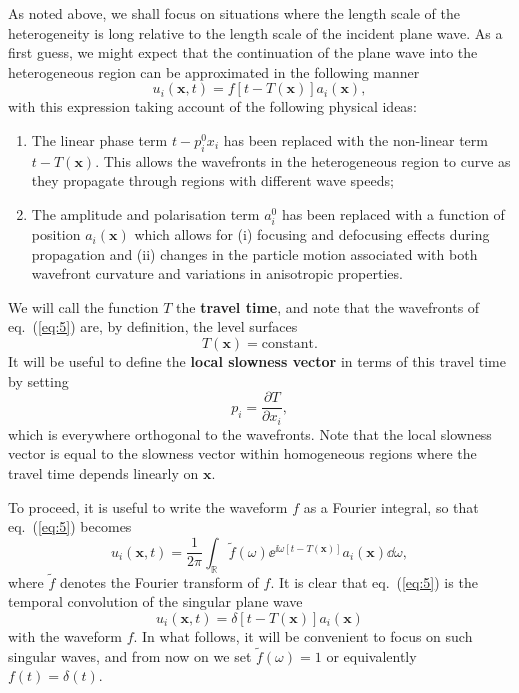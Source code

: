 As noted above, we shall focus on situations where the length scale of the heterogeneity is long 
relative to the length scale of the incident plane wave. As a first guess, we might expect that the continuation of 
the plane wave into the heterogeneous region can be approximated in the following manner
\begin{equation}
u_{i}(\mathbf{x},t)=f[t-T(\mathbf{x})]a_{i}(\mathbf{x}),
\label{eq:5}
\end{equation}
with this expression taking account of the following physical ideas:
\begin{enumerate}
    \item The linear phase term $t-p_{i}^{0}x_{i}$ has been replaced with the non-linear term $t-T(\mathbf{x})$. This allows the 
    wavefronts in the heterogeneous region to curve as they propagate through regions with different wave speeds;
    \item The amplitude and polarisation term $a_{i}^{0}$ has been replaced with a function of position $a_{i}(\mathbf{x})$ which 
    allows for (i) focusing and defocusing effects during propagation and (ii) changes in the particle motion associated 
    with both wavefront curvature and variations in anisotropic properties.
\end{enumerate}
We will call the function $T$ the \textbf{travel time}, and note that the wavefronts of eq.~(\ref{eq:5}) are, by definition, the level surfaces
\begin{equation}
T(\mathbf{x})=\text{constant}.
\label{eq:6}
\end{equation}
It will be useful to define the \textbf{local slowness vector} in terms of this travel time by setting
\begin{equation}
p_{i}=\frac{\partial T}{\partial x_{i}},
\label{eq:7}
\end{equation}
which is everywhere orthogonal to the wavefronts. Note that the local slowness vector is equal 
to the slowness vector within homogeneous regions where the travel time depends linearly on $\mathbf{x}$.

To proceed, it is useful to write the waveform $f$ as a Fourier integral, so that eq.~(\ref{eq:5}) becomes
\begin{equation}
u_{i}(\mathbf{x},t)=\frac{1}{2\pi}\int_{\mathbb{R}}\tilde{f}(\omega)\ee^{\ii\omega[t-T(\mathbf{x})]}a_{i}(\mathbf{x})\dd\omega,
\label{eq:8}
\end{equation}
where $\tilde{f}$ denotes the Fourier transform of $f$. It is clear that eq.~(\ref{eq:5}) is the temporal convolution of the singular plane wave
\begin{equation}
u_{i}(\mathbf{x},t)=\delta[t-T(\mathbf{x})]a_{i}(\mathbf{x})
\label{eq:9}
\end{equation}
with the waveform $f$. In what follows, it will be convenient to focus on such singular waves, and from now on 
we set $\tilde{f}(\omega)=1$ or equivalently $f(t)=\delta(t)$.

